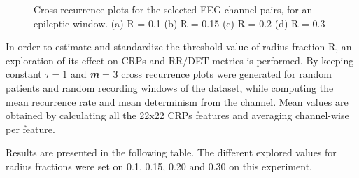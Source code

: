 \documentclass{article}
\begin{document}
\begin{figure}[htbp]
	    \caption{Cross recurrence plots for the selected EEG channel pairs, for an epileptic window. (a) R = 0.1 (b) R = 0.15 (c) R = 0.2 (d) R = 0.3}
	    \label{fig:rp_grid}
	\end{figure}
		


		In order to estimate and standardize the threshold value of radius fraction R, 
		an exploration of its effect on CRPs and RR/DET metrics is performed. 
		By keeping constant $\tau = 1$ and \textbf{\textit{m}} = 3
		cross recurrence plots were generated for random patients and random recording windows of the dataset, while
		computing the mean recurrence rate and mean determinism from the channel. Mean values are obtained by
		calculating  all the 22x22 CRPs features and averaging channel-wise per feature.

		Results are presented in the following table.
		The different explored values for radius fractions were set on
		{ 0.1, 0.15, 0.20 and 0.30} on this experiment.
						
\end{document}
